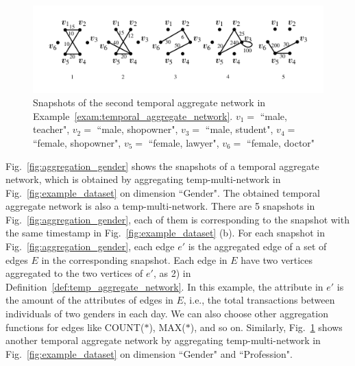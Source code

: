 \documentclass[10pt,journal,compsoc]{IEEEtran}
\begin{document}
\begin{figure}[t!]
	\begin{center}
		\includegraphics[width=0.95\columnwidth]{fig/example/exam_aggregate_gender_pro.pdf}
	\end{center}
	\vspace*{-0.9cm}
	\caption{Snapshots of the second temporal aggregate network in Example~\ref{exam:temporal_aggregate_network}. $ v_1= $ ``male, teacher", $ v_2= $ ``male, shopowner", $ v_3= $ ``male, student", $ v_4= $ ``female, shopowner", $ v_5= $ ``female, lawyer", $ v_6= $ ``female, doctor"}
	\vspace*{-0.4cm}
	\label{fig:aggregation_gender_profession}
\end{figure}

\begin{example} \label{exam:temporal_aggregate_network}
	Fig.~\ref{fig:aggregation_gender} shows the snapshots of a temporal aggregate network, which is obtained by aggregating temp-multi-network in Fig.~\ref{fig:example_dataset} on dimension ``Gender". The obtained temporal aggregate network is also a temp-multi-network. There are 5 snapshots in Fig.~\ref{fig:aggregation_gender}, each of them is corresponding to the snapshot with the same timestamp in Fig.~\ref{fig:example_dataset} (b). For each snapshot in Fig.~\ref{fig:aggregation_gender}, each edge $ e' $ is the aggregated edge of a set of edges $ E $ in the corresponding snapshot. Each edge in $ E $ have two vertices aggregated to the two vertices of $ e' $, as 2) in Definition~\ref{def:temp_aggregate_network}. In this example, the attribute in $ e' $ is the amount of the attributes of edges in $ E $, i.e., the total transactions between individuals of two genders in each day. We can also choose other aggregation functions for edges like COUNT($\ast$), MAX($\ast$), and so on. Similarly, Fig.~\ref{fig:aggregation_gender_profession} shows another temporal aggregate network by aggregating temp-multi-network in Fig.~\ref{fig:example_dataset} on dimension ``Gender" and ``Profession".
\end{example}
\end{document}
